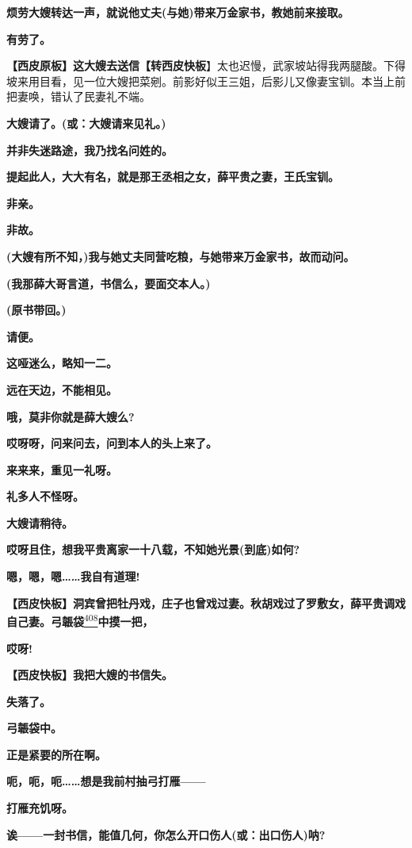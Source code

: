 \textbf{烦劳大嫂转达一声，就说他丈夫(与她)带来万金家书，教她前来接取。}

\textbf{有劳了。}

\textbf{【西皮原板】这大嫂去送信【转西皮快板}】太也迟慢，武家坡站得我两腿酸。下得坡来用目看，见一位大嫂把菜剜。前影好似王三姐，后影儿又像妻宝钏。本当上前把妻唤，错认了民妻礼不端。

\textbf{大嫂请了。(或：大嫂请来见礼。)}

\textbf{并非失迷路途，我乃找名问姓的。}

\textbf{提起此人，大大有名，就是那王丞相之女，薛平贵之妻，王氏宝钏。}

\textbf{非亲。}

\textbf{非故。}

\textbf{(大嫂有所不知，)我与她丈夫同营吃粮，与她带来万金家书，故而动问。}

\textbf{(我那薛大哥言道，书信么，要面交本人。)}

\textbf{(原书带回。)}

\textbf{请便。}

\textbf{这哑迷么，略知一二。}

\textbf{远在天边，不能相见。}

\textbf{哦，莫非你就是薛大嫂么?}

\textbf{哎呀呀，问来问去，问到本人的头上来了。}

\textbf{来来来，重见一礼呀。}

\textbf{礼多人不怪呀。}

\textbf{大嫂请稍待。}

\textbf{哎呀且住，想我平贵离家一十八载，不知她光景(到底)如何?}

\textbf{嗯，嗯，嗯\ldots{}\ldots{}我自有道理!}

\textbf{【西皮快板】洞宾曾把牡丹戏，庄子也曾戏过妻。秋胡戏过了罗敷女，薛平贵调戏自己妻。弓韔袋}\protect\hyperlink{fn408}{\textsuperscript{408}}\textbf{中摸一把，}

\textbf{哎呀!}

\textbf{【西皮快板】我把大嫂的书信失。}

\textbf{失落了。}

\textbf{弓韔袋中。}

\textbf{正是紧要的所在啊。}

\textbf{呃，呃，呃\ldots{}\ldots{}想是我前村抽弓打雁------}

\textbf{打雁充饥呀。}

\textbf{诶------一封书信，能值几何，你怎么开口伤人(或：出口伤人)呐?}

